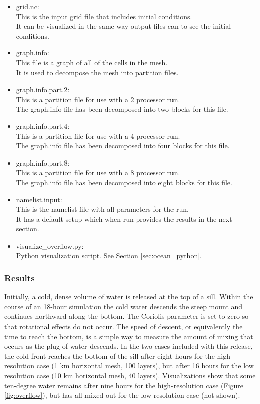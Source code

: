 \begin{itemize}
	\item grid.nc: \\
		This is the input grid file that includes initial conditions.  \\
		It can be visualized in the same way output files can to see the initial conditions.
	\item graph.info: \\
		This file is a graph of all of the cells in the mesh. \\
		It is used to decompose the mesh into partition files.
	\item graph.info.part.2: \\
		This is a partition file for use with a 2 processor run. \\
		The graph.info file has been decomposed into two blocks for this file.
	\item graph.info.part.4: \\
		This is a partition file for use with a 4 processor run. \\
		The graph.info file has been decomposed into four blocks for this file.
	\item graph.info.part.8: \\
		This is a partition file for use with a 8 processor run. \\
		The graph.info file has been decomposed into eight blocks for this file.
	\item namelist.input: \\
		This is the namelist file with all parameters for the run. \\
		It has a default setup which when run provides the results in the next section.
	\item visualize\_overflow.py: \\
		Python visualization script.  See Section \ref{sec:ocean_python}.
\end{itemize}

\subsubsection{Results}
\label{subsubsec:overflow_results}
Initially, a cold, dense volume of water is released at the top of a sill.  Within the course of an 18-hour simulation the cold water descends the steep mount and continues northward along the bottom.  The Coriolis parameter is set to zero so that rotational effects do not occur.  The speed of descent, or equivalently the time to reach the bottom, is a simple way to measure the amount of mixing that occurs as the plug of water descends.  In the two cases included with this release, the cold front reaches the bottom of the sill after eight hours for the high resolution case (1 km horizontal mesh, 100 layers), but after 16 hours for the low resolution case (10 km horizontal mesh, 40 layers).  Visualizations show that some ten-degree water remains after nine hours for the high-resolution case (Figure \ref{fig:overflow}), but has all mixed out for the low-resolution case (not shown).

